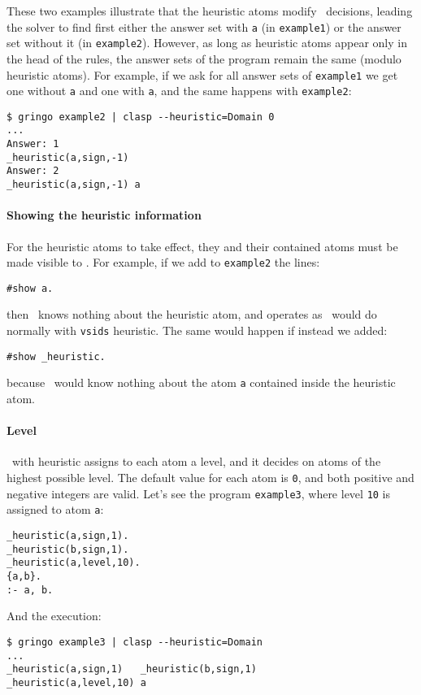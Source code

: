 These two examples illustrate that the heuristic atoms modify \clasp\ decisions,  
leading the solver to find first either the answer set with \texttt{a} (in \texttt{example1}) or the answer set without it (in \texttt{example2}). 
However, as long as heuristic atoms appear only in the head of the rules, 
the answer sets of the program remain the same (modulo heuristic atoms). 
For example, if we ask for all answer sets of \texttt{example1}  we get one without \texttt{a} and one with \texttt{a},  
and the same happens with \texttt{example2}: 
\begin{verbatim}
$ gringo example2 | clasp --heuristic=Domain 0                                                                                
...
Answer: 1                                                                                                           
_heuristic(a,sign,-1)
Answer: 2                                                                                                           
_heuristic(a,sign,-1) a
\end{verbatim}

\paragraph{Showing the heuristic information}

For the heuristic atoms to take effect, they and their contained atoms must be  made visible to \clasp. For example, if we add to \texttt{example2} the lines: 
\begin{verbatim}
#show a.
\end{verbatim}
then \clasp\ knows nothing about the heuristic atom, and operates as \clasp\ would do normally with \texttt{vsids} heuristic. The same would happen if instead we added:  
\begin{verbatim}
#show _heuristic.
\end{verbatim}
 because \clasp\ would know nothing about the atom \texttt{a} contained inside the heuristic atom. 

\paragraph{Level}
\clasp\ with heuristic  assigns to each atom a level, and it decides on atoms of the highest possible level. 
The default value for each atom is \texttt{0},  and both positive and negative integers are valid. 
Let's see the program \texttt{example3}, where level \texttt{10} is assigned to atom \texttt{a}: 
\begin{verbatim}
_heuristic(a,sign,1).
_heuristic(b,sign,1).
_heuristic(a,level,10).
{a,b}.
:- a, b.
\end{verbatim}
And the execution:
\begin{verbatim}
$ gringo example3 | clasp --heuristic=Domain                                                                                  
...
_heuristic(a,sign,1)   _heuristic(b,sign,1) 
_heuristic(a,level,10) a\end{verbatim}

